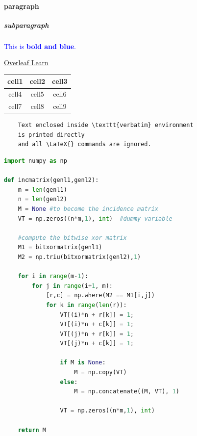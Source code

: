 \documentclass{article}
\begin{document}
\paragraph{paragraph}
\subparagraph{subparagraph}

\textcolor{blue}{This is \textbf{bold and blue}.}

\href{https://www.overleaf.com/learn}
\href{https://www.overleaf.com/learn}{Overleaf Learn} %

\usepackage[letterpaper = true,top=2cm\textwidth, points={1, cane,3 ,4}]{geometry}
\usepackage{listings}

\begin{tabular}{ |c|c|c| }
    \hline
    \textbf{cell1} & cell2 & cell3 \\
    \hline
    cell4 & cell5 & cell6 \\
    \hline
    cell7 & cell8 & cell9 \\
    \hline
\end{tabular}

\begin{verbatim}
    Text enclosed inside \texttt{verbatim} environment
    is printed directly
    and all \LaTeX{} commands are ignored.
\end{verbatim}

\begin{lstlisting}[language=Python]
import numpy as np

def incmatrix(genl1,genl2):
    m = len(genl1)
    n = len(genl2)
    M = None #to become the incidence matrix
    VT = np.zeros((n*m,1), int)  #dummy variable

    #compute the bitwise xor matrix
    M1 = bitxormatrix(genl1)
    M2 = np.triu(bitxormatrix(genl2),1)

    for i in range(m-1):
        for j in range(i+1, m):
            [r,c] = np.where(M2 == M1[i,j])
            for k in range(len(r)):
                VT[(i)*n + r[k]] = 1;
                VT[(i)*n + c[k]] = 1;
                VT[(j)*n + r[k]] = 1;
                VT[(j)*n + c[k]] = 1;

                if M is None:
                    M = np.copy(VT)
                else:
                    M = np.concatenate((M, VT), 1)

                VT = np.zeros((n*m,1), int)

    return M
\end{lstlisting}
\end{document}
